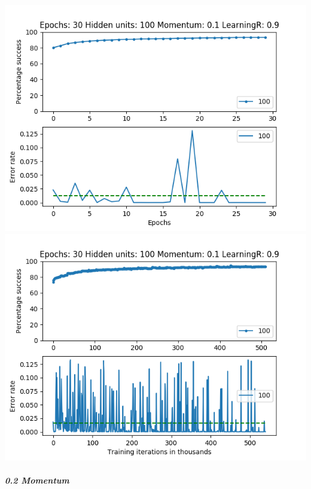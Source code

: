 \documentclass[11pt]{article}
\makeatletter
\def\maxwidth{\ifdim\Gin@nat@width>\linewidth\linewidth
    \else\Gin@nat@width\fi}
\let\Oldincludegraphics\includegraphics
\renewcommand{\includegraphics}[1]{\Oldincludegraphics[width=.8\maxwidth]{#1}}
\makeatother
\begin{document}
\includegraphics{Experiment2/E2_NN_Epoch_Momentum_0.1_30Epochs_100Hiddenunits.png}
\includegraphics{Experiment2/E2_NN_Training_Momentum_0.1_30Epochs_100Hiddenunits.png}

\hypertarget{momentum-2}{%
\subparagraph{0.2 Momentum}\label{momentum-2}}
\end{document}
